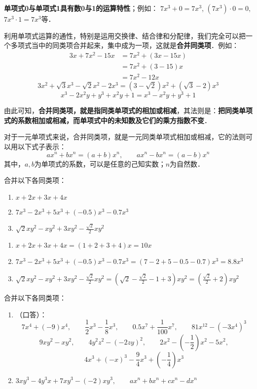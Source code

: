 \textbf{单项式0与单项式1具有数0与1的运算特性}；例如：
$7x^3+0=7x^3$, $(7x^3)\cdot 0=0$, $7x^3\cdot 1=7x^3$等．

利用单项式运算的通性，特别是运用交换律、结合律和分配律，我们完全可以把一个多项式当中的同类项合并起来，集中成为一项，这就是\textbf{合并同类项}．例如：
\begin{align*}
3x+7x^2-15x &= 7x^2+(3x-15x) \tag{交换律，结合律}\\
&=7x^2+(3-15)x \tag{分配律}\\
&=7x^2-12x
\end{align*}
\[3x^2+\sqrt{3}x^3-\sqrt{2}x^2-2x^3=(3-\sqrt{2})x^2+(\sqrt{3}-2)x^3 \]
\[x^3-2x^2y+y^3+x^2y+1=x^3-x^2y+y^3+1 \]

由此可知，\textbf{合并同类项，就是指同类单项式的相加或相减}，其法则是：\textbf{把同类单项式的系数相加或相减，而单项式中的未知数及它们的乘方指数不变}．

对于一元单项式来说，合并同类项，就是一元同类单项式相加或相减，它的法则可以用以下式子表示：
\[\boxed{ax^n +bx^n = (a+b)x^n,\qquad  ax^n -bx^n =(a-b)x^n}\]
其中，$a,b$为单项式的系数，可以是任意的己知实数；$n$为自然数．

\begin{example}
    合并以下各同类项：
    \begin{enumerate}
        \item $x+2x+3x+4x$
        \item $7x^3-2x^3+5x^3+(-0.5)x^3-0.7x^3$
        \item $\sqrt{2}xy^2-xy^2+3xy^2-\frac{\sqrt{2}}{2}xy^2  $
    \end{enumerate}
\end{example}

\begin{solution}
    \begin{enumerate}
        \item $x+2x+3x+4x=(1+2+3+4)x=10x$
        \item $7x^3-2x^3+5x^3+(-0.5)x^3-0.7x^3=(7-2+5-0.5-0.7)x^3=8.8x^3$
        \item $\sqrt{2}xy^2-xy^2+3xy^2-\frac{\sqrt{2}}{2}xy^2=\left(\sqrt{2}-\frac{\sqrt{2}}{2}-1+3\right)xy^2=\left(\frac{\sqrt{2}}{2}+2\right)xy^2$
    \end{enumerate}
\end{solution}

\begin{ex}
    合并以下各同类项：
\begin{enumerate}
    \item （口答）：
    \[7x^4+(-9)x^4,\qquad \frac{1}{2}x^3-\frac{1}{8}x^3,\qquad 0.5x^7+\frac{1}{100}x^7,\qquad 81x^{12}-(-3x^4)^3\]
    \[ 9xy^2-xy^2 ,\qquad 4y^2z^2-(-2zy)^2,\qquad 2x^2-\left(-\frac{1}{2}\right)x^2-5x^2,\]\[ 4x^3+(-x)^3-\frac{9}{4}x^3+\left(-\frac{1}{4}\right)x^3 \]
    \item $3xy^3-4y^3x+7xy^3-(-2)xy^3,\qquad ax^n+bx^n+cx^n-dx^n$
\end{enumerate}
\end{ex}

